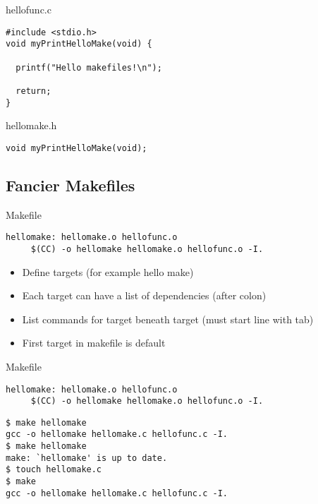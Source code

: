 \documentclass{beamer}
\begin{document}
\begin{frame}[fragile]

\begin{block}{hellofunc.c}
\begin{lstlisting}
#include <stdio.h>
void myPrintHelloMake(void) {

  printf("Hello makefiles!\n");

  return;
}
\end{lstlisting}
\end{block}

\begin{block}{hellomake.h}
\begin{lstlisting}
void myPrintHelloMake(void);
\end{lstlisting}
\end{block}
\end{frame}

\subsection{Fancier Makefiles}
\lstset{language=Make}

\begin{frame}[fragile]
\begin{block}{Makefile}
\begin{lstlisting}
hellomake: hellomake.o hellofunc.o
     $(CC) -o hellomake hellomake.o hellofunc.o -I.
\end{lstlisting}
\end{block}

\begin{itemize}
\item Define targets (for example hello make)
\item Each target can have a list of dependencies (after colon)
\item List commands for target beneath target (must start line with tab)
\item First target in makefile is default
\end{itemize}
\end{frame}

\begin{frame}[fragile]
\begin{block}{Makefile}
\begin{lstlisting}
hellomake: hellomake.o hellofunc.o
     $(CC) -o hellomake hellomake.o hellofunc.o -I.
\end{lstlisting}
\end{block}

\begin{verbatim}
$ make hellomake
gcc -o hellomake hellomake.c hellofunc.c -I.
$ make hellomake
make: `hellomake' is up to date.
$ touch hellomake.c
$ make
gcc -o hellomake hellomake.c hellofunc.c -I.
\end{verbatim}
\end{frame}
\end{document}
